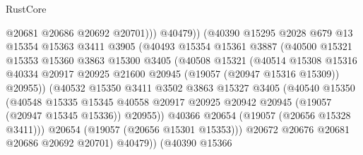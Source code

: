 \begin{lexlean}{RustCore}
\begin{coremodule}
                                @20681
                                @20686
                                @20692
                                @20701)))
                          @40479))
                      (@40390
                        @15295
                        @2028
                        @679
                        @13
                        @15354
                        @15363
                        @3411
                        @3905
                        (@40493
                          @15354
                          @15361
                          @3887
                          (@40500
                            @15321
                            @15353
                            @15360
                            @3863
                            @15300
                            @3405
                            (@40508
                              @15321
                              (@40514
                                @15308
                                @15316
                                @40334
                                @20917
                                @20925
                                @21600
                                @20945
                                (@19057 (@20947 @15316 @15309))
                                @20955))
                            (@40532
                              @15350
                              @3411
                              @3502
                              @3863
                              @15327
                              @3405
                              (@40540
                                @15350
                                (@40548
                                  @15335
                                  @15345
                                  @40558
                                  @20917
                                  @20925
                                  @20942
                                  @20945
                                  (@19057 (@20947 @15345 @15336))
                                  @20955))
                              @40366
                              @20654
                              (@19057 (@20656 @15328 @3411)))
                            @20654
                            (@19057 (@20656 @15301 @15353)))
                          @20672
                          @20676
                          @20681
                          @20686
                          @20692
                          @20701)
                        @40479))
                    (@40390
                      @15366

\end{coremodule}
\end{lexlean}
